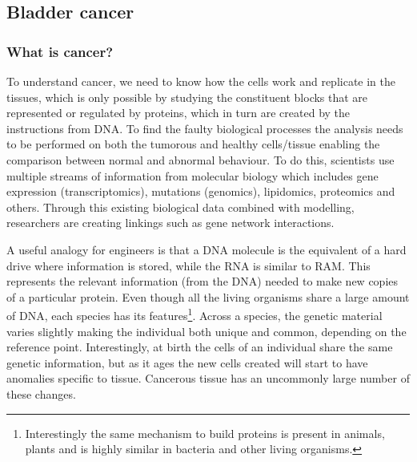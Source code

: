 
\subsection{Bladder cancer} \label{s:lit:biology}

\vspace{3mm}
\vspace{3mm}

\subsubsection{What is cancer?}

To understand cancer, we need to know how the cells work and replicate in the tissues, which is only possible by studying the constituent blocks that are represented or regulated by proteins, which in turn are created by the instructions from DNA. To find the faulty biological processes the analysis needs to be performed on both the tumorous and healthy cells/tissue enabling the comparison between normal and abnormal behaviour. To do this, scientists use multiple streams of information from molecular biology which includes gene expression (transcriptomics), mutations (genomics), lipidomics, proteomics and others. Through this existing biological data combined with modelling, researchers are creating linkings such as gene network interactions. 

A useful analogy for engineers is that a DNA molecule is the equivalent of a hard drive where information is stored, while the RNA is similar to RAM. This represents the relevant information (from the DNA) needed to make new copies of a particular protein. Even though all the living organisms share a large amount of DNA, each species has its features\footnote{Interestingly the same mechanism to build proteins is present in animals, plants and is highly similar in bacteria and other living organisms.}. Across a species, the genetic material varies slightly making the individual both unique and common, depending on the reference point. Interestingly, at birth the cells of an individual share the same genetic information, but as it ages the new cells created will start to have anomalies specific to tissue. Cancerous tissue has an uncommonly large number of these changes.

